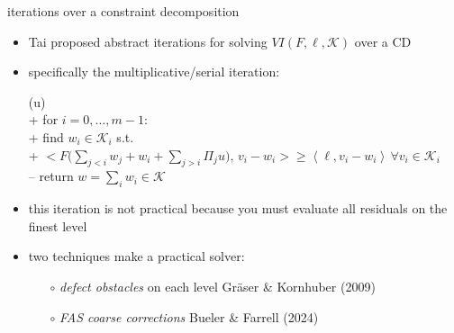 \documentclass[svgnames,
               hyperref={colorlinks,citecolor=DeepPink4,linkcolor=FireBrick,urlcolor=Maroon},
               usepdftitle=false]  %
               {beamer}
\newcommand{\cK}{\mathcal{K}}
\newcommand{\ip}[2]{\left<#1,#2\right>}
\begin{document}
\begin{frame}{iterations over a constraint decomposition}

\begin{itemize}
\item Tai proposed abstract iterations for solving $VI(F,\ell,\mathcal{K})$ over a CD
\item specifically the multiplicative/serial iteration:

{\small
\begin{pseudo}[left-margin=-5mm]
(u)\text{:} \\+
    for $i = 0,\dots,m-1$: \\+
        find $w_i\in \cK_i$ s.t. \\+
            $\displaystyle \Big<F\Big(\sum_{j<i} w_j + w_i + \sum_{j>i} \Pi_j u\Big),\, v_i - w_i\Big> \ge \ip{\ell}{v_i - w_i} \,\forall v_i \in \cK_i$ \\--
    return $w=\sum_i w_i\in\cK$
\end{pseudo}
}

\item this iteration is not practical because you must evaluate all residuals on the finest level
\item two techniques make a practical solver:

    \begin{itemize}
    \item[$\circ$] \emph{defect obstacles} on each level  \hfill {\scriptsize Gr\"aser \& Kornhuber (2009)}
    \item[$\circ$] \emph{FAS coarse corrections}  \hfill {\scriptsize Bueler \& Farrell (2024)}
    \end{itemize}
\end{itemize}
\end{frame}
\end{document}
